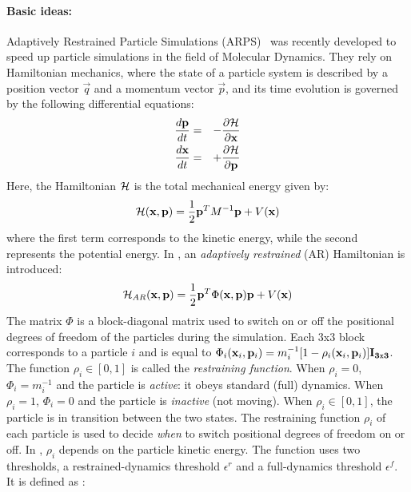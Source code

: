 \paragraph*{Basic ideas:}
Adaptively Restrained Particle Simulations (ARPS)~\cite{Artemova2012} was recently developed to speed up particle simulations in the field of Molecular Dynamics.
They rely on Hamiltonian mechanics, where the state of a particle system is described by a position vector $\vec q$ and a momentum vector $\vec p$, and its time evolution is governed by the following differential equations:
\begin{eqnarray*}
\frac{d\mathbf{p}}{dt} &=& -\frac{\partial \mathcal{H}}{\partial \mathbf{x}} \\
\frac{d\mathbf{x}}{dt} &=& +\frac{\partial \mathcal{H}}{\partial \mathbf{p}}
\end{eqnarray*}
Here, the Hamiltonian $\mathcal{H}$ is the total mechanical energy given by:
\begin{equation}
    \label{eq:hamiltonian}
    \mathcal{H}(\mathbf{x},\mathbf{p}) = \frac{1}{2} \mathbf{p}^{T}M^{-1}\mathbf{p} + V(\mathbf{x})
\end{equation}
where the first term corresponds to the kinetic energy, while the second represents the potential energy.
In \cite{Artemova2012}, an \textit{adaptively restrained} (AR) Hamiltonian is introduced:
\begin{equation}
    \label{eq:arhamiltonian}
    \mathcal{H}_{AR}(\mathbf{x}, \mathbf{p}) = \frac{1}{2} \mathbf{p}^{T}\Phi(\mathbf{x},\mathbf{p})\mathbf{p} + V(\mathbf{x})
\end{equation}
The matrix $\Phi$ is a block-diagonal matrix used to switch on or off the positional degrees of freedom of the particles during the simulation.
Each $3$x$3$ block corresponds to a particle $i$ and is equal to
$\Phi_{i}(\mathbf{x}_{i}, \mathbf{p}_{i}) = m_{i}^{-1}[1 - \rho_{i}(\mathbf{x}_{i}, \mathbf{p}_{i})]\mathbf{I_{3\mathtt{x}3}}$.
The function $\rho_{i} \in [0, 1]$ is called the \emph{restraining function}.
When $\rho_{i} = 0$, $\Phi_{i} = m_{i}^{-1}$ and the particle is \textit{active}: it obeys standard (full) dynamics.
When $\rho_{i} = 1$, $\Phi_{i} = 0$ and the particle is \textit{inactive} (not moving). When $\rho_{i} \in [0, 1]$, the particle is in transition between the two states.
The restraining function $\rho_{i}$ of each particle is used to decide \emph{when} to switch positional degrees of freedom on or off.
In \cite{Artemova2012}, $\rho_{i}$ depends on the particle kinetic energy.
The function uses two thresholds, a restrained-dynamics threshold $\epsilon^{r}$ and a full-dynamics threshold $\epsilon^{f}$.
It is defined as :
